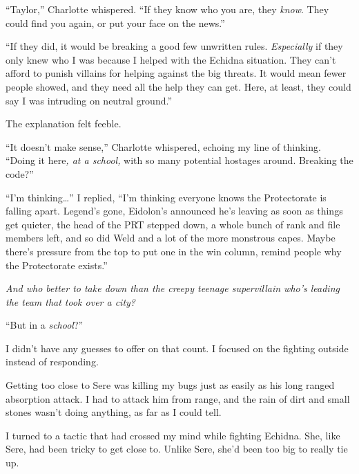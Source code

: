 ``Taylor,'' Charlotte whispered.  ``If they know who you are, they \emph{know}.  They could find you again, or put your face on the news.''



``If they did, it would be breaking a good few unwritten rules.  \emph{Especially} if they only knew who I was because I helped with the Echidna situation.  They can't afford to punish villains for helping against the big threats.  It would mean fewer people showed, and they need all the help they can get.  Here, at least, they could say I was intruding on neutral ground.''



The explanation felt feeble.



``It doesn't make sense,'' Charlotte whispered, echoing my line of thinking.  ``Doing it here\emph{, at a school, }with so many potential hostages around.  Breaking the code?''



``I'm thinking\ldots'' I replied, ``I'm thinking everyone knows the Protectorate is falling apart.  Legend's gone, Eidolon's announced he's leaving as soon as things get quieter, the head of the PRT stepped down, a whole bunch of rank and file members left, and so did Weld and a lot of the more monstrous capes.  Maybe there's pressure from the top to put one in the win column, remind people why the Protectorate exists.''



\emph{And who better to take down than the creepy teenage supervillain who's leading the team that took over a city?}



``But in a \emph{school}?''



I didn't have any guesses to offer on that count.  I focused on the fighting outside instead of responding.



Getting too close to Sere was killing my bugs just as easily as his long ranged absorption attack.  I had to attack him from range, and the rain of dirt and small stones wasn't doing anything, as far as I could tell.



I turned to a tactic that had crossed my mind while fighting Echidna.  She, like Sere, had been tricky to get close to.  Unlike Sere, she'd been too big to really tie up.



